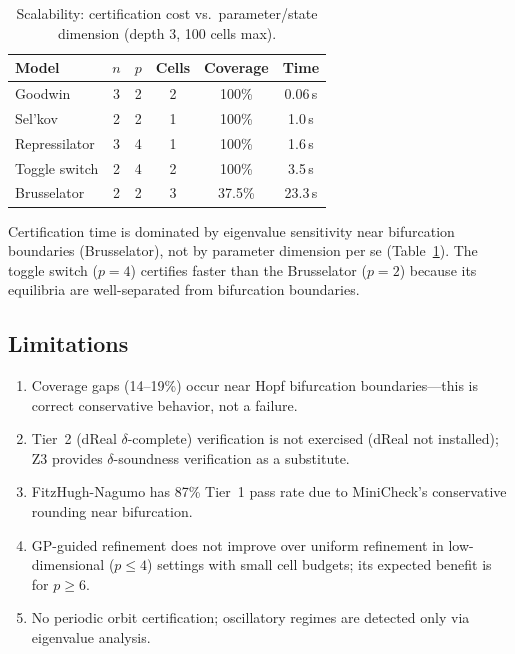 \documentclass[11pt]{article}
\begin{document}
\begin{table}[t]
\centering
\caption{Scalability: certification cost vs.\ parameter/state dimension (depth 3, 100 cells max).}
\label{tab:scalability}
\small
\begin{tabular}{@{}lccccc@{}}
\toprule
Model & $n$ & $p$ & Cells & Coverage & Time \\
\midrule
Goodwin & 3 & 2 & 2 & 100\% & 0.06\,s \\
Sel'kov & 2 & 2 & 1 & 100\% & 1.0\,s \\
Repressilator & 3 & 4 & 1 & 100\% & 1.6\,s \\
Toggle switch & 2 & 4 & 2 & 100\% & 3.5\,s \\
Brusselator & 2 & 2 & 3 & 37.5\% & 23.3\,s \\
\bottomrule
\end{tabular}
\end{table}

Certification time is dominated by eigenvalue sensitivity near bifurcation boundaries (Brusselator), not by parameter dimension per se (Table~\ref{tab:scalability}).
The toggle switch ($p{=}4$) certifies faster than the Brusselator ($p{=}2$) because its equilibria are well-separated from bifurcation boundaries.

\subsection{Limitations}

\begin{enumerate}[leftmargin=*]
\item Coverage gaps (14--19\%) occur near Hopf bifurcation boundaries---this is correct conservative behavior, not a failure.
\item Tier~2 (dReal $\delta$-complete) verification is not exercised (dReal not installed); Z3 provides $\delta$-soundness verification as a substitute.
\item FitzHugh-Nagumo has 87\% Tier~1 pass rate due to MiniCheck's conservative rounding near bifurcation.
\item GP-guided refinement does not improve over uniform refinement in low-dimensional ($p \leq 4$) settings with small cell budgets; its expected benefit is for $p \geq 6$.
\item No periodic orbit certification; oscillatory regimes are detected only via eigenvalue analysis.
\end{enumerate}

\end{document}
